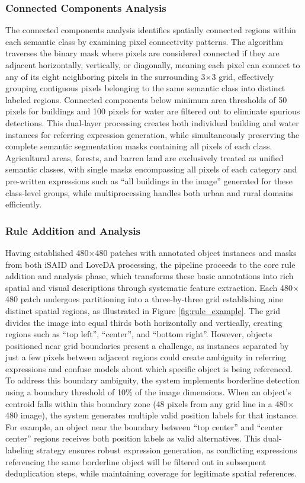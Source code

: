 \subsubsection{Connected Components Analysis}
The connected components analysis identifies spatially connected regions within each semantic class by examining pixel connectivity patterns. The algorithm traverses the binary mask where pixels are considered connected if they are adjacent horizontally, vertically, or diagonally, meaning each pixel can connect to any of its eight neighboring pixels in the surrounding 3$\times$3 grid, effectively grouping contiguous pixels belonging to the same semantic class into distinct labeled regions. Connected components below minimum area thresholds of 50 pixels for buildings and 100 pixels for water are filtered out to eliminate spurious detections. This dual-layer processing creates both individual building and water instances for referring expression generation, while simultaneously preserving the complete semantic segmentation masks containing all pixels of each class. Agricultural areas, forests, and barren land are exclusively treated as unified semantic classes, with single masks encompassing all pixels of each category and pre-written expressions such as ``all buildings in the image'' generated for these class-level groups, while multiprocessing handles both urban and rural domains efficiently.

\subsubsection{Rule Addition and Analysis}
Having established 480$\times$480 patches with annotated object instances and masks from both iSAID and LoveDA processing, the pipeline proceeds to the core rule addition and analysis phase, which transforms these basic annotations into rich spatial and visual descriptions through systematic feature extraction. Each 480$\times$480 patch undergoes partitioning into a three-by-three grid establishing nine distinct spatial regions, as illustrated in Figure \ref{fig:rule_example}. The grid divides the image into equal thirds both horizontally and vertically, creating regions such as ``top left'', ``center'', and ``bottom right''. However, objects positioned near grid boundaries present a challenge, as instances separated by just a few pixels between adjacent regions could create ambiguity in referring expressions and confuse models about which specific object is being referenced. To address this boundary ambiguity, the system implements borderline detection using a boundary threshold of 10\% of the image dimensions. When an object's centroid falls within this boundary zone (48 pixels from any grid line in a 480$\times$480 image), the system generates multiple valid position labels for that instance. For example, an object near the boundary between ``top center'' and ``center center'' regions receives both position labels as valid alternatives. This dual-labeling strategy ensures robust expression generation, as conflicting expressions referencing the same borderline object will be filtered out in subsequent deduplication steps, while maintaining coverage for legitimate spatial references.

